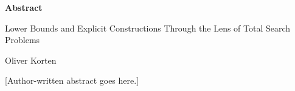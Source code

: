 
\begin{titlepage}
\begin{center}

\vspace*{5\baselineskip}
\textbf{\large Abstract}

Lower Bounds and Explicit Constructions Through the Lens of Total Search Problems

Oliver Korten
\end{center}
\begin{flushleft}
\hspace{10mm}[Author-written abstract goes here.]
\end{flushleft}
\vspace*{\fill}
\end{titlepage}

